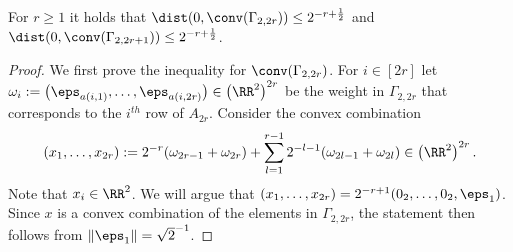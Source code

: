 \begin{lem}\label{lem:convCombQubits}
For $r \geq 1$ it holds that $\dist(0, \conv(\Gamma_{2,2r}) ) \leq 2^{-r+ \frac{1}{2}}$ and $\dist(0, \conv(\Gamma_{2,2r+1}) ) \leq 2^{-r+ \frac{1}{2}}$.
\end{lem}

\begin{proof}
We first prove the inequality for $\conv(\Gamma_{2,2r})$. For $i \in [2r]$ let $\omega_i := \big( \eps_{a(i,1)}, \ldots, \eps_{a(i,2r)} \big) \in \left( \RR^2 \right)^{2r}$ be the weight in $\Gamma_{2,2r}$ that corresponds to the $i^{th}$ row of $A_{2r}$. Consider the convex combination
	\begin{equation}\label{eq:convCombGamma}
	(x_1, \ldots, x_{2r}) := 2^{-r} ( \omega_{2r-1} + \omega_{2r} ) + \sum_{l=1}^{r-1} 2^{-l-1} ( \omega_{2l-1} + \omega_{2l}) \in \left( \RR^2 \right)^{2r}.
	\end{equation}
Note that $x_i \in \RR^2$. We will argue that $(x_1, \dots, x_{2r}) = 2^{-r+1} (0_2,\ldots,0_2, \eps_{1})$.
Since $x$ is a convex combination of the elements in $\Gamma_{2,2r}$, the statement then follows from $\| \eps_1 \| = \sqrt{2}^{-1}$.


\end{proof}
